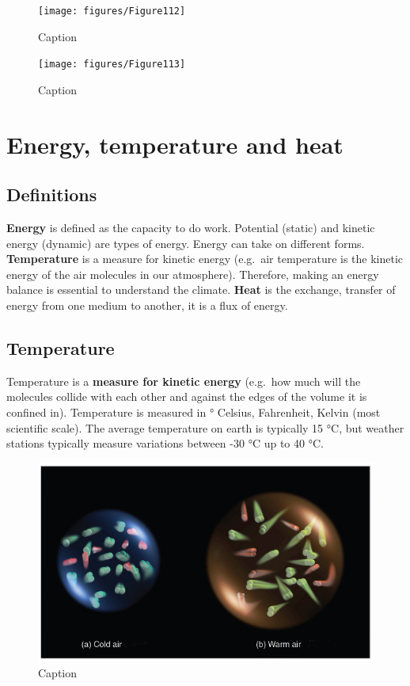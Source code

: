 \documentclass[12pt,oneside]{book}
\begin{document}
\begin{figure}

{\centering \texttt{[image: figures/Figure112]} 

}

\caption{Caption}\label{fig:Land}
\end{figure}

\begin{figure}

{\centering \texttt{[image: figures/Figure113]} 

}

\caption{Caption}\label{fig:Land2}
\end{figure}

\section{Energy, temperature and
heat}\label{energy-temperature-and-heat}

\subsection{Definitions}\label{definitions}

\textbf{Energy} is defined as the capacity to do work. Potential
(static) and kinetic energy (dynamic) are types of energy. Energy can
take on different forms. \textbf{Temperature} is a measure for kinetic
energy (e.g.~air temperature is the kinetic energy of the air molecules
in our atmosphere). Therefore, making an energy balance is essential to
understand the climate. \textbf{Heat} is the exchange, transfer of
energy from one medium to another, it is a flux of energy.

\subsection{Temperature}\label{temperature}

Temperature is a \textbf{measure for kinetic energy} (e.g.~how much will
the molecules collide with each other and against the edges of the
volume it is confined in). Temperature is measured in ° Celsius,
Fahrenheit, Kelvin (most scientific scale). The average temperature on
earth is typically 15 °C, but weather stations typically measure
variations between -30 °C up to 40 °C.

\begin{figure}

{\centering \includegraphics[width=0.5\linewidth]{figures/Figure114} 

}

\caption{Caption}\label{fig:Temperature}
\end{figure}
\end{document}
